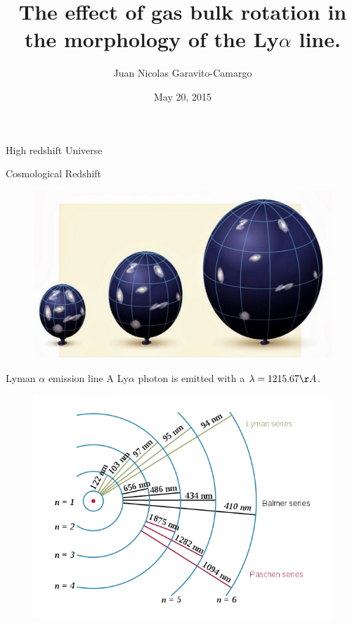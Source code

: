 \documentclass{beamer}
\title[Make a LaTeX presentation using Beamer]{The effect of gas bulk 
rotation in the morphology of the Ly$\alpha$ line.}
\author{Juan Nicolas Garavito-Camargo}
\institute{Universidad de los Andes, Bogot\'a, Colombia}
\date{May 20, 2015}
\begin{document}
\begin{frame}
\titlepage
\author
\institute
\end{frame}

\begin{frame}
High redshift Universe
\end{frame}

\begin{frame}{Cosmological Redshift}
\begin{figure}
\includegraphics[scale=0.3]{Figures/universe-expansion.jpg}
\end{figure}
\end{frame}


\begin{frame}{Lyman $\alpha$ emission line}
A Ly$\alpha$ photon is emitted with a $\lambda= 1215.67 \AA$.  
\begin{figure}
\includegraphics[scale=0.4]{Figures/Hydrogen_transitions.png}
\end{figure}
\end{frame}
\end{document}
